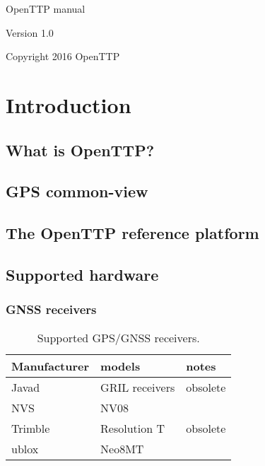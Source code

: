 \documentclass[11pt,a4paper,openany,oneside]{book}
\begin{document}
\begin{titlepage}

\begin{center}
{\Huge OpenTTP manual}
\end{center}

\vspace*{4cm}
\begin{center}
Version 1.0
\end{center}

\begin{center}
Copyright 2016 OpenTTP
\end{center}

\end{titlepage}

\tableofcontents
\listoffigures
\listoftables

\lstset{
	xleftmargin=24pt,
	basewidth=0.5em,
	basicstyle=\ttfamily,
	escapechar=\%
}

\chapter{Introduction}

\section{What is OpenTTP?}

\section{GPS common-view}

\section{The OpenTTP reference platform}

\section{Supported hardware}

	\subsection{GNSS receivers}
	
	\begin{table}
	\begin{tabular}{lll}
	Manufacturer & models & notes \\ \hline
	Javad & GRIL receivers & obsolete \\
	NVS   & NV08 & \\
	Trimble & Resolution T & obsolete\\
	ublox & Neo8MT & \\
	\end{tabular}
	\caption{Supported GPS/GNSS receivers.}
	\end{table}
	
\end{document}
